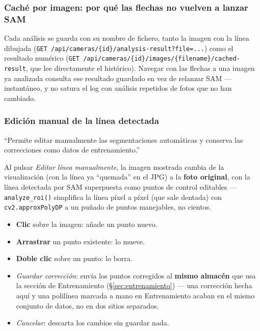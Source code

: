 \subsubsection{Caché por imagen: por qué las flechas no vuelven a lanzar SAM}
\label{sec:cache-por-imagen}

Cada análisis se guarda con su nombre de fichero, tanto la imagen con la línea dibujada
(\texttt{GET /api/cameras/\{id\}/analysis-result?file=...}) como el resultado numérico
(\texttt{GET /api/cameras/\{id\}/images/\{filename\}/cached-result}, que lee directamente el
histórico). Navegar con las flechas a una imagen ya analizada consulta ese resultado guardado en
vez de relanzar SAM — instantáneo, y no satura el log con análisis repetidos de fotos que no han
cambiado.

\subsubsection{Edición manual de la línea detectada}
\label{sec:edicion-manual}

\begin{infobox}
``Permite editar manualmente las segmentaciones automáticas y conserva las correcciones como
datos de entrenamiento.''
\end{infobox}

Al pulsar \textit{Editar línea manualmente}, la imagen mostrada cambia de la visualización
(con la línea ya ``quemada'' en el JPG) a la \textbf{foto original}, con la línea detectada por
SAM superpuesta como puntos de control editables —\texttt{analyze\_roi()} simplifica la línea
píxel a píxel (que sale dentada) con \texttt{cv2.approxPolyDP} a un puñado de puntos manejables,
no cientos.

\begin{itemize}[leftmargin=1.5em]
  \item \textbf{Clic} sobre la imagen: añade un punto nuevo.
  \item \textbf{Arrastrar} un punto existente: lo mueve.
  \item \textbf{Doble clic} sobre un punto: lo borra.
  \item \textit{Guardar corrección}: envía los puntos corregidos al \textbf{mismo almacén} que
        usa la sección de Entrenamiento (\S\ref{sec:entrenamiento}) — una corrección hecha aquí y
        una polilínea marcada a mano en Entrenamiento acaban en el mismo conjunto de datos, no en
        dos sitios separados.
  \item \textit{Cancelar}: descarta los cambios sin guardar nada.
\end{itemize}

